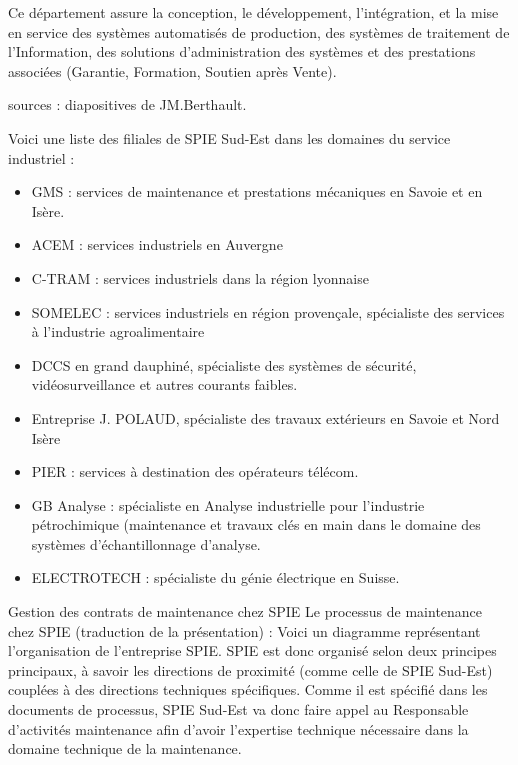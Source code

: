 Ce département assure la conception, le développement, l’intégration, et la mise en service des systèmes automatisés de production, des systèmes de traitement de l’Information, des solutions d’administration des systèmes et des prestations associées (Garantie, Formation, Soutien après Vente).

sources : diapositives de JM.Berthault.

Voici une liste des filiales de SPIE Sud-Est dans les domaines du service industriel :

\begin{itemize}
\item GMS : services de maintenance et prestations mécaniques en Savoie et en Isère.
\item ACEM : services industriels en Auvergne
\item C-TRAM : services industriels dans la région lyonnaise
\item SOMELEC : services industriels en région provençale, spécialiste des services à l’industrie agroalimentaire
\item DCCS en grand dauphiné, spécialiste des systèmes de sécurité, vidéosurveillance et autres courants faibles.
\item Entreprise J. POLAUD, spécialiste des travaux extérieurs en Savoie et Nord Isère
\item PIER : services à destination des opérateurs télécom.
\item GB Analyse : spécialiste en Analyse industrielle pour l’industrie pétrochimique (maintenance et travaux clés en main dans le domaine des systèmes d’échantillonnage d’analyse.
\item ELECTROTECH : spécialiste du génie électrique en Suisse.
\end{itemize}


Gestion des contrats de maintenance chez SPIE
Le processus de maintenance chez SPIE (traduction de la présentation) :
Voici un diagramme représentant l'organisation de l'entreprise SPIE. SPIE est donc organisé selon deux principes principaux, à savoir les directions de proximité (comme celle de SPIE Sud-Est) couplées à des directions techniques spécifiques. Comme il est spécifié dans les documents de processus, SPIE Sud-Est va donc faire appel au Responsable d'activités maintenance afin d'avoir l'expertise technique nécessaire dans la domaine technique de la maintenance.

